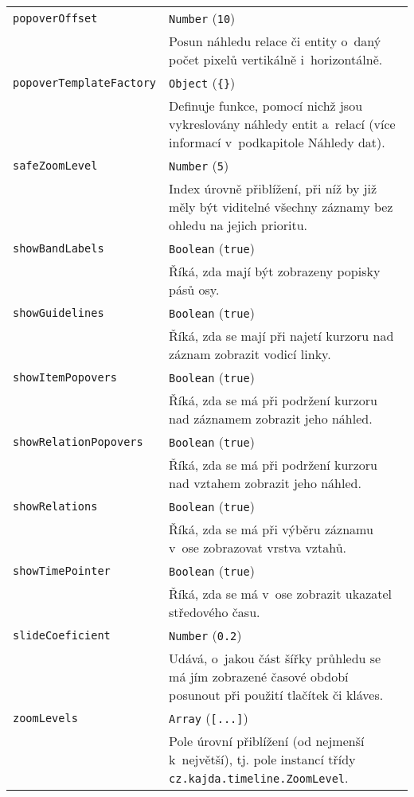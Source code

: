 {\begin{longtable}{|p{}p{}|}
		\hline
		{\tt popoverOffset} & {\tt Number} \hfill ({\tt 10})\\
		& Posun náhledu relace či entity o~daný počet pixelů vertikálně i~horizontálně.\\
		
		\hline
		{\tt popoverTemplate\-Factory} & {\tt Object} \hfill ({\tt \{\}})\\[-5mm]
		& Definuje funkce, pomocí nichž jsou vykreslovány náhledy entit a~relací (více informací v~podkapitole Náhledy dat). \\
		
		\hline
		{\tt safeZoomLevel} & {\tt Number} \hfill ({\tt 5})\\
		& Index úrovně přiblížení, při níž by již měly být viditelné všechny záznamy bez ohledu na jejich prioritu. \\
		
		\hline
		{\tt showBandLabels} & {\tt Boolean} \hfill ({\tt true})\\
		& Říká, zda mají být zobrazeny popisky pásů osy. \\
		\hline
		{\tt showGuidelines} & {\tt Boolean} \hfill ({\tt true})\\
		& Říká, zda se mají při najetí kurzoru nad záznam zobrazit vodicí linky. \\
		\hline
		{\tt showItemPopovers} & {\tt Boolean} \hfill ({\tt true})\\
		& Říká, zda se má při podržení kurzoru nad záznamem zobrazit jeho náhled. \\
		\hline
		{\tt showRelation\-Popovers} & {\tt Boolean} \hfill ({\tt true})\\
		& Říká, zda se má při podržení kurzoru nad vztahem zobrazit jeho náhled. \\
		\hline
		{\tt showRelations} & {\tt Boolean} \hfill ({\tt true})\\
		& Říká, zda se má při výběru záznamu v~ose zobrazovat vrstva vztahů. \\
		\hline
		{\tt showTimePointer} & {\tt Boolean} \hfill ({\tt true})\\
		& Říká, zda se má v~ose zobrazit ukazatel středového času. \\
		\hline
		{\tt slideCoeficient} & {\tt Number} \hfill ({\tt 0.2})\\
		& Udává, o~jakou část šířky průhledu se má jím zobrazené časové období posunout při použití tlačítek či kláves. \\
		\hline
		{\tt zoomLevels} & {\tt Array} \hfill ({\tt [...]})\\
		& Pole úrovní přiblížení (od nejmenší k~největší), tj. pole instancí třídy {\tt cz.kajda.timeline.ZoomLevel}. \\
		\hline
	\end{longtable}
	
}
